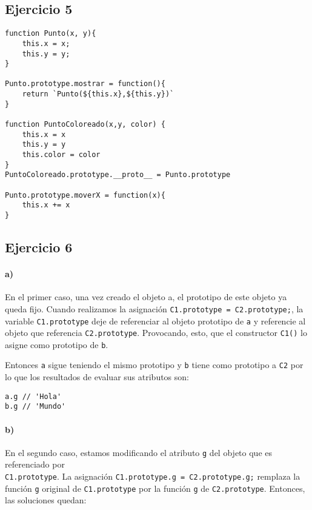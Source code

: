\documentclass[10pt,a4paper]{article}
\begin{document}
\subsection{Ejercicio 5}
\begin{centrado}
\begin{verbatim}
function Punto(x, y){
    this.x = x;
    this.y = y;
}

Punto.prototype.mostrar = function(){
    return `Punto(${this.x},${this.y})`
}

function PuntoColoreado(x,y, color) {
    this.x = x
    this.y = y
    this.color = color
}
PuntoColoreado.prototype.__proto__ = Punto.prototype

Punto.prototype.moverX = function(x){
    this.x += x
}
\end{verbatim}
\end{centrado}

\subsection{Ejercicio 6}
\paragraph{a)} En el primer caso, una vez creado el objeto a, el prototipo de este objeto ya queda fijo. Cuando realizamos la asignación \texttt{C1.prototype = C2.prototype;}, la variable \texttt{C1.prototype} deje de referenciar al objeto prototipo de \texttt{a} y referencie al objeto que referencia \texttt{C2.prototype}. Provocando, esto, que el constructor \texttt{C1()} lo asigne como prototipo de \texttt{b}.

Entonces \texttt{a} sigue teniendo el mismo prototipo y \texttt{b} tiene como prototipo a \texttt{C2} por lo que los resultados de evaluar sus atributos son:

\begin{centrado}
\begin{verbatim}
a.g // 'Hola'
b.g // 'Mundo'
\end{verbatim}
\end{centrado}

\paragraph{b)} En el segundo caso, estamos modificando el atributo \texttt{g} del objeto que es referenciado por \\ \texttt{C1.prototype}. La asignación \texttt{C1.prototype.g = C2.prototype.g;} remplaza la función \texttt{g} original de \texttt{C1.prototype} por la función \texttt{g} de \texttt{C2.prototype}.
Entonces, las soluciones quedan:
\end{document}
